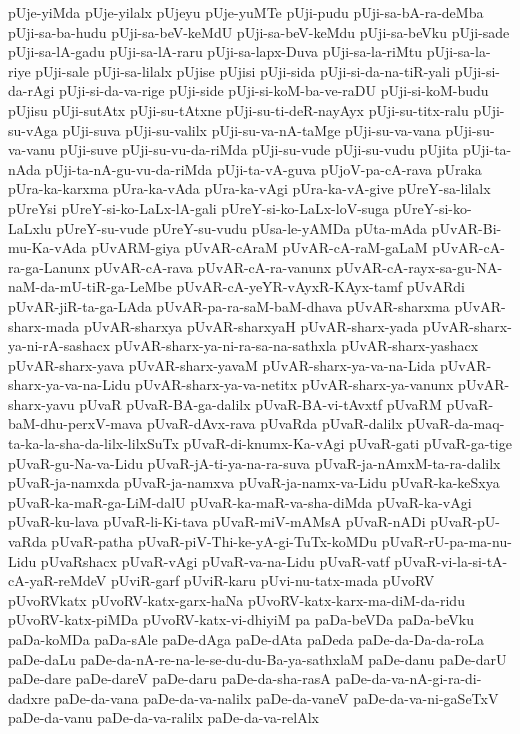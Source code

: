 {pUje-yiMda
pUje-yilalx
pUjeyu
pUje-yuMTe
pUji-pudu
pUji-sa-bA-ra-deMba
pUji-sa-ba-hudu
pUji-sa-beV-keMdU
pUji-sa-beV-keMdu
pUji-sa-beVku
pUji-sade
pUji-sa-lA-gadu
pUji-sa-lA-raru
pUji-sa-lapx-Duva
pUji-sa-la-riMtu
pUji-sa-la-riye
pUji-sale
pUji-sa-lilalx
pUjise
pUjisi
pUji-sida
pUji-si-da-na-tiR-yali
pUji-si-da-rAgi
pUji-si-da-va-rige
pUji-side
pUji-si-koM-ba-ve-raDU
pUji-si-koM-budu
pUjisu
pUji-sutAtx
pUji-su-tAtxne
pUji-su-ti-deR-nayAyx
pUji-su-titx-ralu
pUji-su-vAga
pUji-suva
pUji-su-valilx
pUji-su-va-nA-taMge
pUji-su-va-vana
pUji-su-va-vanu
pUji-suve
pUji-su-vu-da-riMda
pUji-su-vude
pUji-su-vudu
pUjita
pUji-ta-nAda
pUji-ta-nA-gu-vu-da-riMda
pUji-ta-vA-guva
pUjoV-pa-cA-rava
pUraka
pUra-ka-karxma
pUra-ka-vAda
pUra-ka-vAgi
pUra-ka-vA-give
pUreY-sa-lilalx
pUreYsi
pUreY-si-ko-LaLx-lA-gali
pUreY-si-ko-LaLx-loV-suga
pUreY-si-ko-LaLxlu
pUreY-su-vude
pUreY-su-vudu
pUsa-le-yAMDa
pUta-mAda
pUvAR-Bi-mu-Ka-vAda
pUvARM-giya
pUvAR-cAraM
pUvAR-cA-raM-gaLaM
pUvAR-cA-ra-ga-Lanunx
pUvAR-cA-rava
pUvAR-cA-ra-vanunx
pUvAR-cA-rayx-sa-gu-NA-naM-da-mU-tiR-ga-LeMbe
pUvAR-cA-yeYR-vAyxR-KAyx-tamf
pUvARdi
pUvAR-jiR-ta-ga-LAda
pUvAR-pa-ra-saM-baM-dhava
pUvAR-sharxma
pUvAR-sharx-mada
pUvAR-sharxya
pUvAR-sharxyaH
pUvAR-sharx-yada
pUvAR-sharx-ya-ni-rA-sashacx
pUvAR-sharx-ya-ni-ra-sa-na-sathxla
pUvAR-sharx-yashacx
pUvAR-sharx-yava
pUvAR-sharx-yavaM
pUvAR-sharx-ya-va-na-Lida
pUvAR-sharx-ya-va-na-Lidu
pUvAR-sharx-ya-va-netitx
pUvAR-sharx-ya-vanunx
pUvAR-sharx-yavu
pUvaR
pUvaR-BA-ga-dalilx
pUvaR-BA-vi-tAvxtf
pUvaRM
pUvaR-baM-dhu-perxV-mava
pUvaR-dAvx-rava
pUvaRda
pUvaR-dalilx
pUvaR-da-maq-ta-ka-la-sha-da-lilx-lilxSuTx
pUvaR-di-knumx-Ka-vAgi
pUvaR-gati
pUvaR-ga-tige
pUvaR-gu-Na-va-Lidu
pUvaR-jA-ti-ya-na-ra-suva
pUvaR-ja-nAmxM-ta-ra-dalilx
pUvaR-ja-namxda
pUvaR-ja-namxva
pUvaR-ja-namx-va-Lidu
pUvaR-ka-keSxya
pUvaR-ka-maR-ga-LiM-dalU
pUvaR-ka-maR-va-sha-diMda
pUvaR-ka-vAgi
pUvaR-ku-lava
pUvaR-li-Ki-tava
pUvaR-miV-mAMsA
pUvaR-nADi
pUvaR-pU-vaRda
pUvaR-patha
pUvaR-piV-Thi-ke-yA-gi-TuTx-koMDu
pUvaR-rU-pa-ma-nu-Lidu
pUvaRshacx
pUvaR-vAgi
pUvaR-va-na-Lidu
pUvaR-vatf
pUvaR-vi-la-si-tA-cA-yaR-reMdeV
pUviR-garf
pUviR-karu
pUvi-nu-tatx-mada
pUvoRV
pUvoRVkatx
pUvoRV-katx-garx-haNa
pUvoRV-katx-karx-ma-diM-da-ridu
pUvoRV-katx-piMDa
pUvoRV-katx-vi-dhiyiM
pa
paDa-beVDa
paDa-beVku
paDa-koMDa
paDa-sAle
paDe-dAga
paDe-dAta
paDeda
paDe-da-Da-da-roLa
paDe-daLu
paDe-da-nA-re-na-le-se-du-du-Ba-ya-sathxlaM
paDe-danu
paDe-darU
paDe-dare
paDe-dareV
paDe-daru
paDe-da-sha-rasA
paDe-da-va-nA-gi-ra-di-dadxre
paDe-da-vana
paDe-da-va-nalilx
paDe-da-vaneV
paDe-da-va-ni-gaSeTxV
paDe-da-vanu
paDe-da-va-ralilx
paDe-da-va-relAlx
}
